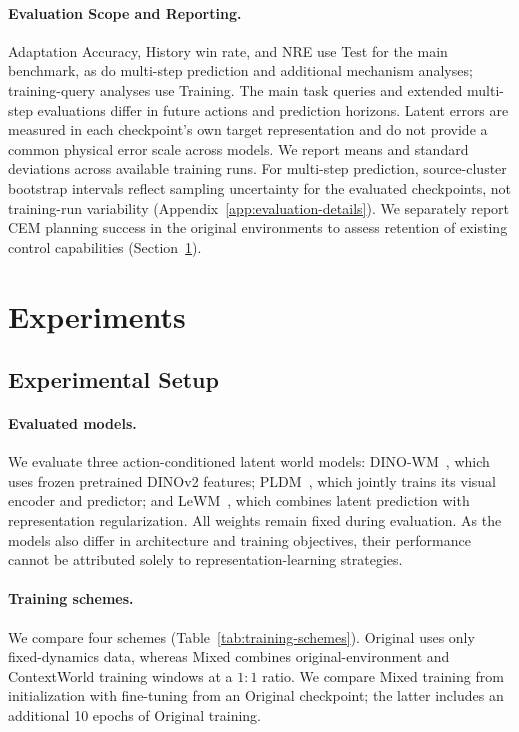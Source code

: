 \paragraph{Evaluation Scope and Reporting.}
Adaptation Accuracy, History win rate, and NRE use Test for the main benchmark, as do multi-step prediction and additional mechanism analyses; training-query analyses use Training.
The main task queries and extended multi-step evaluations differ in future actions and prediction horizons.
Latent errors are measured in each checkpoint's own target representation and do not provide a common physical error scale across models.
We report means and standard deviations across available training runs.
For multi-step prediction, source-cluster bootstrap intervals reflect sampling uncertainty for the evaluated checkpoints, not training-run variability (Appendix~\ref{app:evaluation-details}).
We separately report CEM planning success in the original environments to assess retention of existing control capabilities (Section~\ref{sec:experiments}).

\section{Experiments}
\label{sec:experiments}


\subsection{Experimental Setup}
\label{sec:experimental-setup}

\paragraph{Evaluated models.}
We evaluate three action-conditioned latent world models:
DINO-WM~\cite{zhou2025dinowm}, which uses frozen pretrained DINOv2 features;
PLDM~\cite{sobal2025pldm}, which jointly trains its visual encoder and predictor;
and LeWM~\cite{maes2026leworldmodel}, which combines latent prediction with representation regularization.
All weights remain fixed during evaluation.
As the models also differ in architecture and training objectives, their performance cannot be attributed solely to representation-learning strategies.

\paragraph{Training schemes.}
We compare four schemes (Table~\ref{tab:training-schemes}).
Original uses only fixed-dynamics data, whereas Mixed combines original-environment and ContextWorld training windows at a $1:1$ ratio.
We compare Mixed training from initialization with fine-tuning from an Original checkpoint; the latter includes an additional 10 epochs of Original training.


